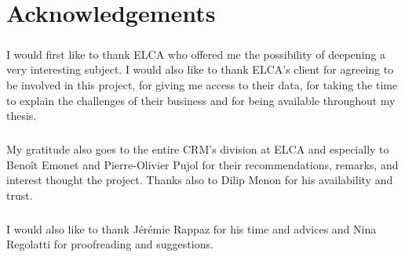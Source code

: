\chapter*{Acknowledgements}

\vspace{0.5cm}

\paragraph{}
I would first like to thank ELCA who offered me the possibility of deepening a very interesting subject. I would also like to thank ELCA's client for agreeing to be involved in this project, for giving me access to their data, for taking the time to explain the challenges of their business and for being available throughout my thesis.

\paragraph{}
My gratitude also goes to the entire CRM's division at ELCA and especially to Benoît Emonet and Pierre-Olivier Pujol for their recommendations, remarks, and interest thought the project. Thanks also to Dilip Menon for his availability and trust.


\paragraph{}
I would also like to thank Jérémie Rappaz for his time and advices and Nina Regolatti for proofreading and suggestions.
